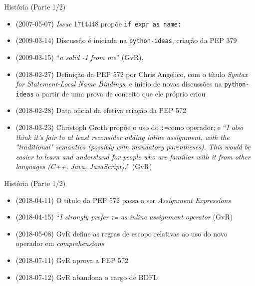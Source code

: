 \documentclass[utf8]{beamer}
\begin{document}
\begin{frame}{História (Parte 1/2)}
  \begin{itemize}
    \item (2007-05-07) \emph{Issue} 1714448 propõe
                       \texttt{if expr as name:}
    \item (2009-03-14) Discussão é iniciada na \texttt{python-ideas},
                       criação da PEP 379
    \item (2009-03-15) ``\emph{a solid -1 from me}'' (GvR),
    \item (2018-02-27) Definição da PEP 572 por Chris Angelico,
                       com o título
                       \emph{Syntax for Statement-Local Name Bindings},
                       e início de novas discussões
                       na \texttt{python-ideas}
                       a partir de uma prova de conceito
                       que ele próprio criou
    \item (2018-02-28) Data oficial da efetiva criação da PEP 572
    \item (2018-03-23)
    Christoph Groth  propõe o uso do \texttt{:=}como operador; e
    ``\emph{I also think it's fair to at least reconsider
            adding inline assignment,
            with the "traditional" semantics
            (possibly with mandatory parentheses).
            This would be easier to learn and understand
            for people who are familiar with it
            from other languages (C++, Java, JavaScript).}'' (GvR)
  \end{itemize}
\end{frame}

\begin{frame}{História (Parte 1/2)}
  \begin{itemize}
    \item (2018-04-11) O título da PEP 572 passa a ser
                       \emph{Assignment Expressions}
    \item (2018-04-15) ``\emph{I strongly prefer \texttt{:=}
                               as inline assignment operator} (GvR)
    \item (2018-05-08) GvR define as regras de escopo
                       relativas ao uso do novo operador
                       em \emph{comprehensions}
    \item (2018-07-11) GvR aprova a PEP 572
    \item (2018-07-12) GvR abandona o cargo de BDFL
  \end{itemize}
\end{frame}
\end{document}
